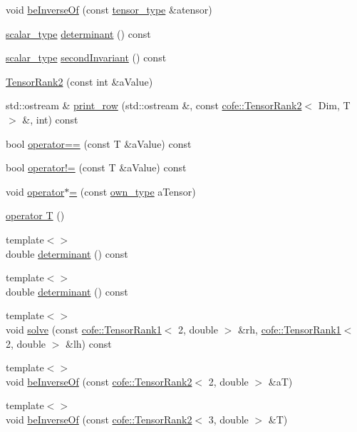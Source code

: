 \begin{DoxyCompactItemize}
void \hyperlink{classcofe_1_1TensorRank2_a5bb4a7f811368240ecf93ff89da64fb7}{be\-Inverse\-Of} (const \hyperlink{classcofe_1_1TensorRank2_a3af9468088af4836c93808edaceb03b0}{tensor\-\_\-type} \&atensor)
\item 
\hyperlink{classcofe_1_1TensorRank2_a3dce726b0c34912c6549a5911f478eaf}{scalar\-\_\-type} \hyperlink{classcofe_1_1TensorRank2_a6201d2f1f6491c789bfb77a914ee7354}{determinant} () const 
\item 
\hyperlink{classcofe_1_1TensorRank2_a3dce726b0c34912c6549a5911f478eaf}{scalar\-\_\-type} \hyperlink{classcofe_1_1TensorRank2_a043df152939c4a51e9804b56395736c0}{second\-Invariant} () const 
\item 
\hyperlink{classcofe_1_1TensorRank2_ac44f4cc0b8489564a74cb3544677bc51}{Tensor\-Rank2} (const int \&a\-Value)
\item 
std\-::ostream \& \hyperlink{classcofe_1_1TensorRank2_ad139dabcd7509b655c11c06b453e4e46}{print\-\_\-row} (std\-::ostream \&, const \hyperlink{classcofe_1_1TensorRank2}{cofe\-::\-Tensor\-Rank2}$<$ Dim, T $>$ \&, int) const 
\item 
bool \hyperlink{classcofe_1_1TensorRank2_ae34c4793ec388270b417d717a1624efd}{operator==} (const T \&a\-Value) const 
\item 
bool \hyperlink{classcofe_1_1TensorRank2_a87093b92ee8219d1aeb7bfae06035a71}{operator!=} (const T \&a\-Value) const 
\item 
void \hyperlink{classcofe_1_1TensorRank2_a328a64fd8f4f688ad9689c94d815f985}{operator$\ast$=} (const \hyperlink{classcofe_1_1TensorRank2_afef4f2c69f8a804d795c334bc382dc5f}{own\-\_\-type} a\-Tensor)
\item 
\hyperlink{classcofe_1_1TensorRank2_ab39e8b2dbb0866f8a861e42129895256}{operator T} ()
\item 
{\footnotesize template$<$$>$ }\\double \hyperlink{classcofe_1_1TensorRank2_aefe719d34b9be7ae253816fac48e6638}{determinant} () const
\item 
{\footnotesize template$<$$>$ }\\double \hyperlink{classcofe_1_1TensorRank2_a76949c747b16d53913a508e16ac14cbd}{determinant} () const
\item 
{\footnotesize template$<$$>$ }\\void \hyperlink{classcofe_1_1TensorRank2_ac44ed3575539ab2a418407db1ecba9be}{solve} (const \hyperlink{classcofe_1_1TensorRank1}{cofe\-::\-Tensor\-Rank1}$<$ 2, double $>$ \&rh, \hyperlink{classcofe_1_1TensorRank1}{cofe\-::\-Tensor\-Rank1}$<$ 2, double $>$ \&lh) const
\item 
{\footnotesize template$<$$>$ }\\void \hyperlink{classcofe_1_1TensorRank2_a695bdbb2f78d143642bd79bf07a6a770}{be\-Inverse\-Of} (const \hyperlink{classcofe_1_1TensorRank2}{cofe\-::\-Tensor\-Rank2}$<$ 2, double $>$ \&a\-T)
\item 
{\footnotesize template$<$$>$ }\\void \hyperlink{classcofe_1_1TensorRank2_a287c066e522677f57aa945d99455abbf}{be\-Inverse\-Of} (const \hyperlink{classcofe_1_1TensorRank2}{cofe\-::\-Tensor\-Rank2}$<$ 3, double $>$ \&T)
\end{DoxyCompactItemize}
